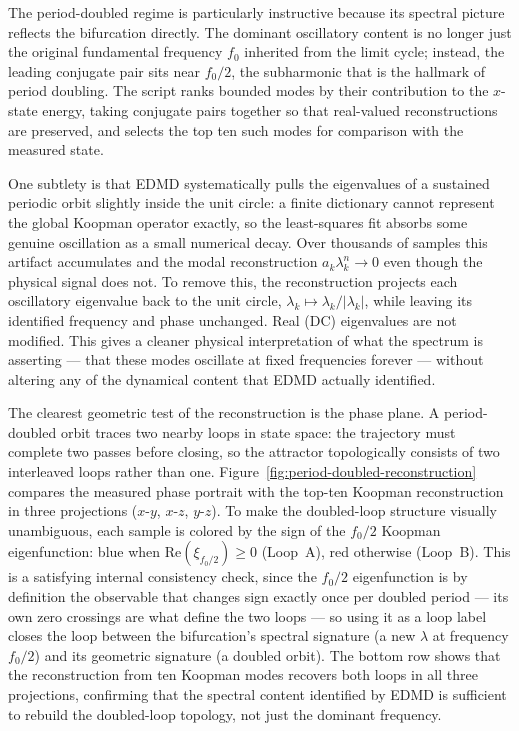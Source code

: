 \documentclass[11pt]{article}
\begin{document}
The period-doubled regime is particularly instructive because its spectral picture reflects the bifurcation directly. The dominant oscillatory content is no longer just the original fundamental frequency $f_0$ inherited from the limit cycle; instead, the leading conjugate pair sits near $f_0/2$, the subharmonic that is the hallmark of period doubling. The script ranks bounded modes by their contribution to the $x$-state energy, taking conjugate pairs together so that real-valued reconstructions are preserved, and selects the top ten such modes for comparison with the measured state.

One subtlety is that EDMD systematically pulls the eigenvalues of a sustained periodic orbit slightly inside the unit circle: a finite dictionary cannot represent the global Koopman operator exactly, so the least-squares fit absorbs some genuine oscillation as a small numerical decay. Over thousands of samples this artifact accumulates and the modal reconstruction $a_k \lambda_k^n \to 0$ even though the physical signal does not. To remove this, the reconstruction projects each oscillatory eigenvalue back to the unit circle, $\lambda_k \mapsto \lambda_k / |\lambda_k|$, while leaving its identified frequency and phase unchanged. Real (DC) eigenvalues are not modified. This gives a cleaner physical interpretation of what the spectrum is asserting --- that these modes oscillate at fixed frequencies forever --- without altering any of the dynamical content that EDMD actually identified.

The clearest geometric test of the reconstruction is the phase plane. A period-doubled orbit traces two nearby loops in state space: the trajectory must complete two passes before closing, so the attractor topologically consists of two interleaved loops rather than one. Figure~\ref{fig:period-doubled-reconstruction} compares the measured phase portrait with the top-ten Koopman reconstruction in three projections ($x$-$y$, $x$-$z$, $y$-$z$). To make the doubled-loop structure visually unambiguous, each sample is colored by the sign of the $f_0/2$ Koopman eigenfunction: blue when $\mathrm{Re}(\xi_{f_0/2}) \geq 0$ (Loop~A), red otherwise (Loop~B). This is a satisfying internal consistency check, since the $f_0/2$ eigenfunction is by definition the observable that changes sign exactly once per doubled period --- its own zero crossings are what define the two loops --- so using it as a loop label closes the loop between the bifurcation's spectral signature (a new $\lambda$ at frequency $f_0/2$) and its geometric signature (a doubled orbit). The bottom row shows that the reconstruction from ten Koopman modes recovers both loops in all three projections, confirming that the spectral content identified by EDMD is sufficient to rebuild the doubled-loop topology, not just the dominant frequency.
\end{document}
